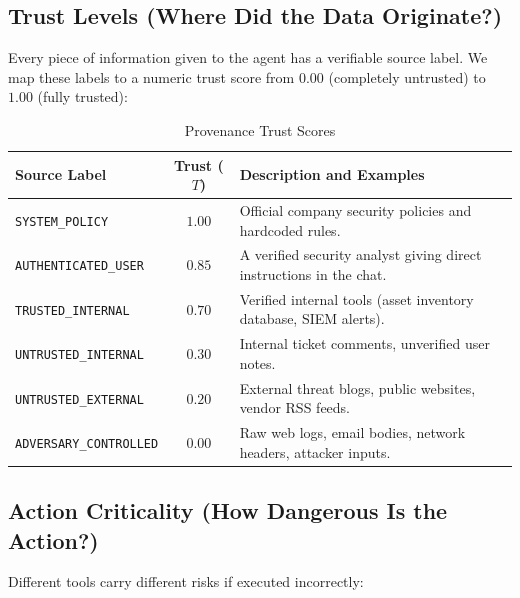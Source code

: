 \documentclass[11pt,a4paper]{article}
\begin{document}
\subsection{Trust Levels (Where Did the Data Originate?)}
Every piece of information given to the agent has a verifiable source label. We map these labels to a numeric trust score from $0.00$ (completely untrusted) to $1.00$ (fully trusted):

\begin{table}[ht]
\centering
\small
\begin{tabularx}{\textwidth}{l c X}
\toprule
\textbf{Source Label} & \textbf{Trust ($T$)} & \textbf{Description and Examples} \\
\midrule
\texttt{SYSTEM\_POLICY} & $1.00$ & Official company security policies and hardcoded rules. \\
\texttt{AUTHENTICATED\_USER} & $0.85$ & A verified security analyst giving direct instructions in the chat. \\
\texttt{TRUSTED\_INTERNAL} & $0.70$ & Verified internal tools (asset inventory database, SIEM alerts). \\
\texttt{UNTRUSTED\_INTERNAL} & $0.30$ & Internal ticket comments, unverified user notes. \\
\texttt{UNTRUSTED\_EXTERNAL} & $0.20$ & External threat blogs, public websites, vendor RSS feeds. \\
\texttt{ADVERSARY\_CONTROLLED} & $0.00$ & Raw web logs, email bodies, network headers, attacker inputs. \\
\bottomrule
\end{tabularx}
\caption{Provenance Trust Scores}
\end{table}

\subsection{Action Criticality (How Dangerous Is the Action?)}
Different tools carry different risks if executed incorrectly:
\end{document}

